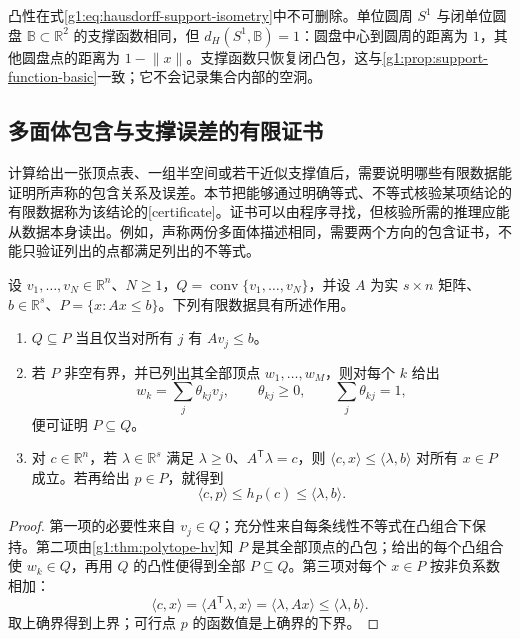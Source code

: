 凸性在式\eqref{g1:eq:hausdorff-support-isometry}中不可删除。单位圆周 \(S^1\) 与闭单位圆盘 \(\mathbb B\subset\mathbb R^2\) 的支撑函数相同，但 \(d_H(S^1,\mathbb B)=1\)：圆盘中心到圆周的距离为 \(1\)，其他圆盘点的距离为 \(1-\lVert x\rVert\)。支撑函数只恢复闭凸包，这与\cref{g1:prop:support-function-basic}一致；它不会记录集合内部的空洞。

\subsection{多面体包含与支撑误差的有限证书}
\label{g1:subsec:B03:03}

计算给出一张顶点表、一组半空间或若干近似支撑值后，需要说明哪些有限数据能证明所声称的包含关系及误差。本节把能够通过明确等式、不等式核验某项结论的有限数据称为该结论的[certificate]。证书可以由程序寻找，但核验所需的推理应能从数据本身读出。例如，声称两份多面体描述相同，需要两个方向的包含证书，不能只验证列出的点都满足列出的不等式。

\begin{proposition}\label{g1:prop:finite-polytope-certificates}
	设 \(v_1,\ldots,v_N\in\mathbb R^n\)、\(N\ge1\)，\(Q=\operatorname{conv}\{v_1,\ldots,v_N\}\)，并设 \(A\) 为实 \(s\times n\) 矩阵、\(b\in\mathbb R^s\)、\(P=\{x:Ax\le b\}\)。下列有限数据具有所述作用。
	\begin{enumerate}
		\item \(Q\subseteq P\) 当且仅当对所有 \(j\) 有 \(Av_j\le b\)。
		\item 若 \(P\) 非空有界，并已列出其全部顶点 \(w_1,\ldots,w_M\)，则对每个 \(k\) 给出
		\[
			w_k=\sum_j\theta_{kj}v_j,\qquad
			\theta_{kj}\ge0,\qquad \sum_j\theta_{kj}=1,
		\]
		便可证明 \(P\subseteq Q\)。
		\item 对 \(c\in\mathbb R^n\)，若 \(\lambda\in\mathbb R^s\) 满足 \(\lambda\ge0\)、\(A^{\mathsf T}\lambda=c\)，则 \(\langle c,x\rangle\le\langle\lambda,b\rangle\) 对所有 \(x\in P\) 成立。若再给出 \(p\in P\)，就得到
		\[
			\langle c,p\rangle\le h_P(c)\le\langle\lambda,b\rangle.
		\]
	\end{enumerate}
\end{proposition}
\begin{proof}
	第一项的必要性来自 \(v_j\in Q\)；充分性来自每条线性不等式在凸组合下保持。第二项由\cref{g1:thm:polytope-hv}知 \(P\) 是其全部顶点的凸包；给出的每个凸组合使 \(w_k\in Q\)，再用 \(Q\) 的凸性便得到全部 \(P\subseteq Q\)。第三项对每个 \(x\in P\) 按非负系数相加：
	\[
		\langle c,x\rangle=\langle A^{\mathsf T}\lambda,x\rangle
		=\langle\lambda,Ax\rangle\le\langle\lambda,b\rangle.
	\]
	取上确界得到上界；可行点 \(p\) 的函数值是上确界的下界。
\end{proof}

